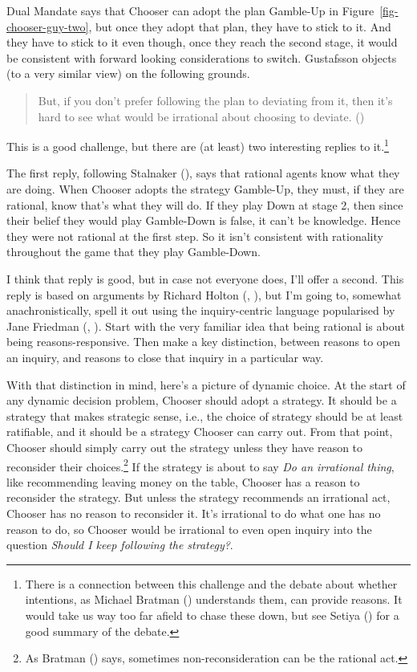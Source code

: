 \documentclass[
  11pt,
  letterpaper,
  DIV=11,
  numbers=noendperiod,
  twoside]{scrartcl}
\begin{document}
Dual Mandate says that Chooser can adopt the plan Gamble-Up in
Figure~\ref{fig-chooser-guy-two}, but once they adopt that plan, they
have to stick to it. And they have to stick to it even though, once they
reach the second stage, it would be consistent with forward looking
considerations to switch. Gustafsson objects (to a very similar view) on
the following grounds.

\begin{quote}
But, if you don't prefer following the plan to deviating from it, then
it's hard to see what would be irrational about choosing to deviate.
()
\end{quote}

This is a good challenge, but there are (at least) two interesting
replies to it.\footnote{There is a connection between this challenge and
  the debate about whether intentions, as Michael Bratman
  () understands them, can provide
  reasons. It would take us way too far afield to chase these down, but
  see Setiya () for a good
  summary of the debate.}

The first reply, following Stalnaker
(), says that rational agents know
what they are doing. When Chooser adopts the strategy Gamble-Up, they
must, if they are rational, know that's what they will do. If they play
Down at stage 2, then since their belief they would play Gamble-Down is
false, it can't be knowledge. Hence they were not rational at the first
step. So it isn't consistent with rationality throughout the game that
they play Gamble-Down.

I think that reply is good, but in case not everyone does, I'll offer a
second. This reply is based on arguments by Richard Holton
(, ), but
I'm going to, somewhat anachronistically, spell it out using the
inquiry-centric language popularised by Jane Friedman
(, ).
Start with the very familiar idea that being rational is about being
reasons-responsive. Then make a key distinction, between reasons to open
an inquiry, and reasons to close that inquiry in a particular way.

With that distinction in mind, here's a picture of dynamic choice. At
the start of any dynamic decision problem, Chooser should adopt a
strategy. It should be a strategy that makes strategic sense, i.e., the
choice of strategy should be at least ratifiable, and it should be a
strategy Chooser can carry out. From that point, Chooser should simply
carry out the strategy unless they have reason to reconsider their
choices.\footnote{As Bratman () says,
  sometimes non-reconsideration can be the rational act.} If the
strategy is about to say \emph{Do an irrational thing}, like
recommending leaving money on the table, Chooser has a reason to
reconsider the strategy. But unless the strategy recommends an
irrational act, Chooser has no reason to reconsider it. It's irrational
to do what one has no reason to do, so Chooser would be irrational to
even open inquiry into the question \emph{Should I keep following the
strategy?}.
\end{document}
